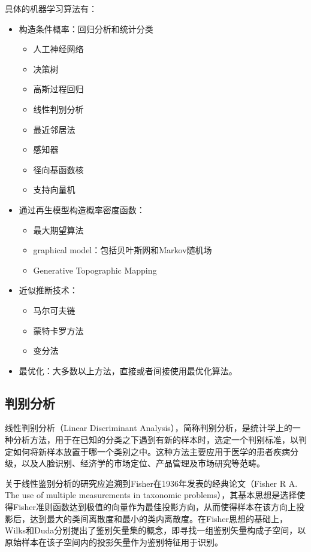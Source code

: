\documentclass[11pt,a4paper,twoside]{book}
\begin{document}
具体的机器学习算法有：
\begin{itemize}
  \item 构造条件概率：回归分析和统计分类
    \begin{itemize}
      \item 人工神经网络
      \item 决策树
      \item 高斯过程回归
      \item 线性判别分析
      \item 最近邻居法
      \item 感知器
      \item 径向基函数核
      \item 支持向量机
    \end{itemize}
  \item 通过再生模型构造概率密度函数：
    \begin{itemize}
      \item 最大期望算法
      \item graphical model：包括贝叶斯网和Markov随机场
      \item Generative Topographic Mapping
    \end{itemize}
  \item 近似推断技术：
    \begin{itemize}
      \item 马尔可夫链
      \item 蒙特卡罗方法
      \item 变分法
    \end{itemize}
  \item 最优化：大多数以上方法，直接或者间接使用最优化算法。
\end{itemize}

\subsection{判别分析}
线性判别分析（Linear Discriminant Analysis），简称判别分析，是统计学上的一种分析方法，用于在已知的分类之下遇到有新的样本时，选定一个判别标准，以判定如何将新样本放置于哪一个类别之中。这种方法主要应用于医学的患者疾病分级，以及人脸识别、经济学的市场定位、产品管理及市场研究等范畴。

关于线性鉴别分析的研究应追溯到Fisher在1936年发表的经典论文（Fisher R A. The use of multiple measurements in taxonomic problems），其基本思想是选择使得Fisher准则函数达到极值的向量作为最佳投影方向，从而使得样本在该方向上投影后，达到最大的类间离散度和最小的类内离散度。在Fisher思想的基础上，Wilks和Duda分别提出了鉴别矢量集的概念，即寻找一组鉴别矢量构成子空间，以原始样本在该子空间内的投影矢量作为鉴别特征用于识别。 
\end{document}
